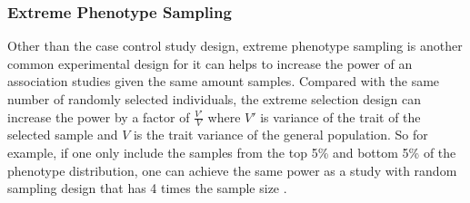 \documentclass[12pt]{scrbook}
\begin{document}
\subsubsection{Extreme Phenotype Sampling}
Other than the case control study design, extreme phenotype sampling is another common experimental design for it can helps to increase the power of an association studies given the same amount samples.
Compared with the same number of randomly selected individuals, the extreme selection design can increase the power by a factor of $\frac{V'}{V}$ where $V'$ is variance of the trait of the selected sample and $V$ is the trait variance of the general population.
So for example, if one only include the samples from the top 5\% and bottom 5\% of the phenotype distribution, one can achieve the same power as a study with random sampling design that has 4 times the sample size \citep{Sham2014}. 
\end{document}
